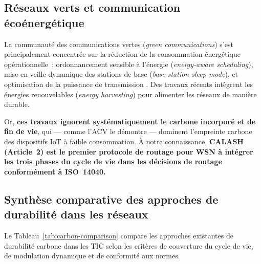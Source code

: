 \subsection{Réseaux verts et communication écoénergétique}

La communauté des communications vertes (\emph{green communications}) s'est principalement concentrée sur la réduction de la consommation énergétique opérationnelle~: ordonnancement sensible à l'énergie (\emph{energy-aware scheduling}), mise en veille dynamique des stations de base (\emph{base station sleep mode}), et optimisation de la puissance de transmission \cite{freitag2021ict,andrae2021real_climate,itu_ict2025}. Des travaux récents intègrent les énergies renouvelables (\emph{energy harvesting}) pour alimenter les réseaux de manière durable.

Or, \textbf{ces travaux ignorent systématiquement le carbone incorporé et de fin de vie}, qui --- comme l'ACV le démontre --- dominent l'empreinte carbone des dispositifs IoT à faible consommation. À notre connaissance, \textbf{CALASH (Article~2) est le premier protocole de routage pour WSN à intégrer les trois phases du cycle de vie dans les décisions de routage conformément à ISO~14040.}

\subsection{Synthèse comparative des approches de durabilité dans les réseaux}

Le Tableau~\ref{tab:carbon-comparison} compare les approches existantes de durabilité carbone dans les TIC selon les critères de couverture du cycle de vie, de modulation dynamique et de conformité aux normes.

